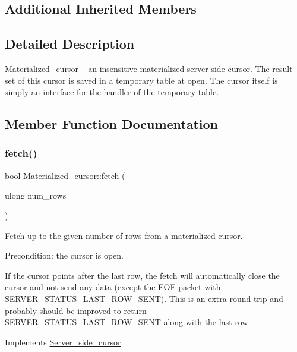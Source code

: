 \subsection*{Additional Inherited Members}


\subsection{Detailed Description}
\mbox{\hyperlink{classMaterialized__cursor}{Materialized\+\_\+cursor}} -- an insensitive materialized server-\/side cursor. The result set of this cursor is saved in a temporary table at open. The cursor itself is simply an interface for the handler of the temporary table. 

\subsection{Member Function Documentation}
\mbox{\label{classMaterialized__cursor_a1536d980f3500d1c52070c8ef09a7423}} 
\subsubsection{\texorpdfstring{fetch()}{fetch()}}
{\footnotesize\ttfamily bool Materialized\+\_\+cursor\+::fetch (\begin{DoxyParamCaption}\item[{ulong}]{num\+\_\+rows }\end{DoxyParamCaption})\hspace{0.3cm}{\ttfamily [virtual]}}

Fetch up to the given number of rows from a materialized cursor.

Precondition\+: the cursor is open.

If the cursor points after the last row, the fetch will automatically close the cursor and not send any data (except the \textquotesingle{}E\+OF\textquotesingle{} packet with S\+E\+R\+V\+E\+R\+\_\+\+S\+T\+A\+T\+U\+S\+\_\+\+L\+A\+S\+T\+\_\+\+R\+O\+W\+\_\+\+S\+E\+NT). This is an extra round trip and probably should be improved to return S\+E\+R\+V\+E\+R\+\_\+\+S\+T\+A\+T\+U\+S\+\_\+\+L\+A\+S\+T\+\_\+\+R\+O\+W\+\_\+\+S\+E\+NT along with the last row. 

Implements \mbox{\hyperlink{classServer__side__cursor}{Server\+\_\+side\+\_\+cursor}}.

